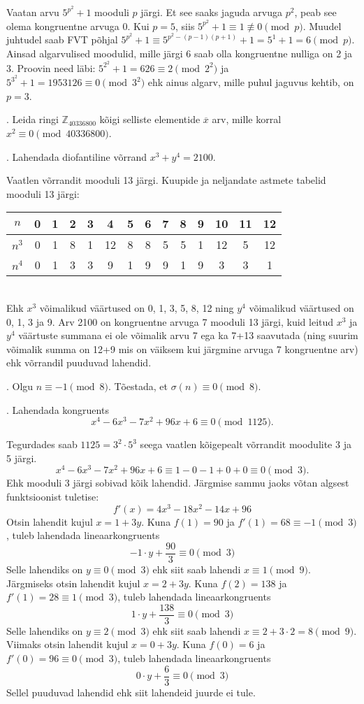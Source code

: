 \documentclass[a4paper, 10pt]{article}
\newcommand{\Z}{\mathbb{Z}}
\begin{document}
\bigskip
Vaatan arvu $5^{p^2}+1$ mooduli $p$ järgi. Et see saaks jaguda arvuga $p^2$, peab see olema kongruentne arvuga 0. Kui $p=5$, siis $5^{p^2}+1\equiv1\not\equiv0\pmod p$. Muudel juhtudel saab FVT põhjal \mbox{$5^{p^2}+1\equiv5^{p^2-(p-1)(p+1)}+1=5^1+1=6\pmod p$}. Ainsad algarvulised moodulid, mille järgi 6 saab olla kongruentne nulliga on 2 ja 3. Proovin need läbi: $5^{2^2}+1=626\equiv2\pmod{2^2}$ ja $5^{3^2}+1=1953126\equiv0\pmod{3^2}$ ehk ainus algarv, mille puhul jaguvus kehtib, on $p=3$.
\bigskip

. Leida ringi $\Z_{40336800}$ kõigi selliste elementide $\overline{x}$ arv, mille korral $x^2\equiv 0\pmod{40336800}$. 

\bigskip

. Lahendada diofantiline võrrand $x^3+y^4=2100$.

\bigskip
Vaatlen võrrandit mooduli 13 järgi. Kuupide ja neljandate astmete tabelid mooduli 13 järgi:\\
\begin{tabular}{c|c|c|c|c|c|c|c|c|c|c|c|c|c}
$n$&0&1&2&3&4&5&6&7&8&9&10&11&12\\
\hline
$n^3$&0&1&8&1&12&8&8&5&5&1&12&5&12\\
\hline
$n^4$&0&1&3&3&9&1&9&9&1&9&3&3&1
\end{tabular}\\
Ehk $x^3$ võimalikud väärtused on 0, 1, 3, 5, 8, 12 ning $y^4$ võimalikud väärtused on 0, 1, 3 ja 9. Arv 2100 on kongruentne arvuga 7 mooduli 13 järgi, kuid leitud $x^3$ ja $y^4$ väärtuste summana ei ole võimalik arvu 7 ega ka 7+13 saavutada (ning suurim võimalik summa on 12+9 mis on väiksem kui järgmine arvuga 7 kongruentne arv) ehk võrrandil puuduvad lahendid.
\bigskip

. Olgu $n\equiv -1\pmod{8}$. Tõestada, et $\sigma(n)\equiv 0 \pmod{8}$. 

\bigskip

. Lahendada kongruents $$x^4-6x^3-7x^2+96x+6\equiv 0 \pmod{1125}.$$

\bigskip
Tegurdades saab $1125=3^2\cdot5^3$ seega vaatlen kõigepealt võrrandit moodulite 3 ja 5 järgi. $$x^4-6x^3-7x^2+96x+6\equiv 1-0-1+0+0\equiv0  \pmod{3}.$$ Ehk mooduli 3 järgi sobivad kõik lahendid. Järgmise sammu jaoks võtan algsest funktsioonist tuletise: $$f'(x)=4x^3-18x^2-14x+96$$ Otsin lahendit kujul $x=1+3y$. Kuna $f(1)=90$ ja $f'(1)=68\equiv-1\pmod3$, tuleb lahendada lineaarkongruents $$-1\cdot y+\frac{90}{3}\equiv0\pmod3$$ Selle lahendiks on $y\equiv0\pmod3$ ehk siit saab lahendi $x\equiv1\pmod9$. Järgmiseks otsin lahendit kujul $x=2+3y$. Kuna $f(2)=138$ ja $f'(1)=28\equiv1\pmod3$, tuleb lahendada lineaarkongruents $$1\cdot y+\frac{138}{3}\equiv0\pmod3$$ Selle lahendiks on $y\equiv2\pmod3$ ehk siit saab lahendi $x\equiv2+3\cdot2=8\pmod9$. Viimaks otsin lahendit kujul $x=0+3y$. Kuna $f(0)=6$ ja $f'(0)=96\equiv0\pmod3$, tuleb lahendada lineaarkongruents $$0\cdot y+\frac{6}{3}\equiv0\pmod3$$ Sellel puuduvad lahendid ehk siit lahendeid juurde ei tule.
\end{document}

